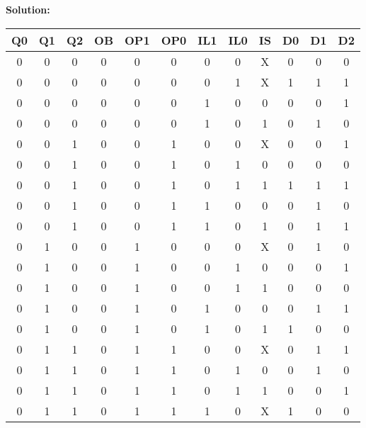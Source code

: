 \textbf{Solution:}

\begin{table}[H]
    \centering
    \begin{tabular}{|c|c|c|c|c|c|c|c|c|c|c|c|}
        \hline
        \textbf{Q0} & \textbf{Q1} & \textbf{Q2} & \textbf{OB} & \textbf{OP1} & \textbf{OP0} & \textbf{IL1} & \textbf{IL0} & \textbf{IS} & \textbf{D0} & \textbf{D1} & \textbf{D2} \\
        \hline
        0  & 0  & 0  & 0  & 0   & 0   & 0   & 0   & X  & 0  & 0  & 0  \\ \hline
        0  & 0  & 0  & 0  & 0   & 0   & 0   & 1   & X  & 1  & 1  & 1  \\ \hline
        0  & 0  & 0  & 0  & 0   & 0   & 1   & 0   & 0  & 0  & 0  & 1  \\ \hline
        0  & 0  & 0  & 0  & 0   & 0   & 1   & 0   & 1  & 0  & 1  & 0  \\ \hline
        0  & 0  & 1  & 0  & 0   & 1   & 0   & 0   & X  & 0  & 0  & 1  \\ \hline
        0  & 0  & 1  & 0  & 0   & 1   & 0   & 1   & 0  & 0  & 0  & 0  \\ \hline
        0  & 0  & 1  & 0  & 0   & 1   & 0   & 1   & 1  & 1  & 1  & 1  \\ \hline
        0  & 0  & 1  & 0  & 0   & 1   & 1   & 0   & 0  & 0  & 1  & 0  \\ \hline
        0  & 0  & 1  & 0  & 0   & 1   & 1   & 0   & 1  & 0  & 1  & 1  \\ \hline
        0  & 1  & 0  & 0  & 1   & 0   & 0   & 0   & X  & 0  & 1  & 0  \\ \hline
        0  & 1  & 0  & 0  & 1   & 0   & 0   & 1   & 0  & 0  & 0  & 1  \\ \hline
        0  & 1  & 0  & 0  & 1   & 0   & 0   & 1   & 1  & 0  & 0  & 0  \\ \hline
        0  & 1  & 0  & 0  & 1   & 0   & 1   & 0   & 0  & 0  & 1  & 1  \\ \hline
        0  & 1  & 0  & 0  & 1   & 0   & 1   & 0   & 1  & 1  & 0  & 0  \\ \hline
        0  & 1  & 1  & 0  & 1   & 1   & 0   & 0   & X  & 0  & 1  & 1  \\ \hline
        0  & 1  & 1  & 0  & 1   & 1   & 0   & 1   & 0  & 0  & 1  & 0  \\ \hline
        0  & 1  & 1  & 0  & 1   & 1   & 0   & 1   & 1  & 0  & 0  & 1  \\ \hline
        0  & 1  & 1  & 0  & 1   & 1   & 1   & 0   & X  & 1  & 0  & 0  \\ \hline

\end{tabular}
\end{table}
